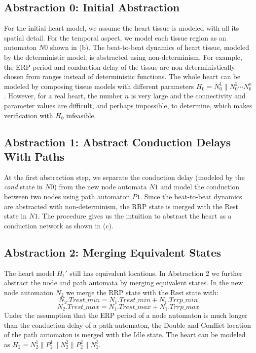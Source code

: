 \subsection{Abstraction 0: Initial Abstraction}
For the initial heart model, we assume the heart tissue is modeled with all its spatial detail. For the temporal aspect, we model each tissue region as an automaton $N0$ shown in (b). The beat-to-beat dynamics of heart tissue, modeled by the deterministic model, is abstracted using non-determinism. For example, the ERP period and conduction delay of the tissue are non-deterministically chosen from ranges instead of deterministic functions. The whole heart can be modeled by composing tissue models with different parameters $H_0=N_0^1\|N_0^2\cdots N_0^n$. However, for a real heart, the number $n$ is very large and the connectivity and parameter values are difficult, and perhaps impossible, to determine, which makes verification with $H_0$ infeasible. 

\subsection{Abstraction 1: Abstract Conduction Delays With Paths}
At the first abstraction step, we separate the conduction delay (modeled by the \emph{cond} state in $N0$) from the new node automata $N1$ and model the conduction between two nodes using path automaton $P1$. Since the beat-to-beat dynamics are abstracted with non-determinism, the RRP state is merged with the Rest state in $N1$. The procedure gives us the intuition to abstract the heart as a conduction network as shown in  (c). 

\subsection{Abstraction 2: Merging Equivalent States}
The heart model $H_1'$ still has equivalent locations. In Abstraction 2 we further abstract the node and path automata by merging equivalent states. In the new node automaton $N_2$ we merge the \textsf{RRP} state with the \textsf{Rest} state with:
$$N_2.Trest\_min = N_1.Trest\_min+N_1.Trrp\_min$$
$$N_2.Trest\_max = N_1.Trest\_max+N_1.Trrp\_max$$
Under the assumption that the ERP period of a node automaton is much longer than the conduction delay of a path automaton,  the \textsf{Double} and \textsf{Conflict} location of the path automaton is merged with the \textsf{Idle} state. The heart can be modeled as $H_2=N_2^1\| P_2^1\| N_2^2\| P_2^2\| N_2^3$.

